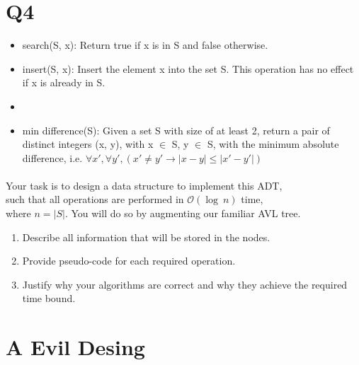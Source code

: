 \documentclass{article}
\begin{document}
\newpage

\section*{Q4}

\begin{itemize}
    \item search(S, x): Return true if x is in S and false otherwise.
    \item insert(S, x): Insert the element x into the set S.
          This operation has no effect if x is already in S.
    \item {}
    \item min difference(S): Given a set S with size of at least 2, return a pair of distinct integers (x, y),
          \newline
          with x $\in$ S, y $\in$ S, with the minimum absolute difference, i.e.
          \newline
          $\forall x', \forall y', (x' \neq y' \rightarrow |x - y| \leq |x' - y'|)$
\end{itemize}
\paragraph{}
Your task is to design a data structure to implement this ADT, \\
such that all operations are performed in $\mathcal{O} (\log\ n)$ time, \\
where $n = |S|$. You will do so by augmenting our familiar AVL tree.

\begin{enumerate}
    \item Describe all information that will be stored in the nodes.
    \item Provide pseudo-code for each required operation.
    \item Justify why your algorithms are correct and why they achieve the required time bound.
\end{enumerate}

\newpage

\section*{A Evil Desing}
\end{document}

